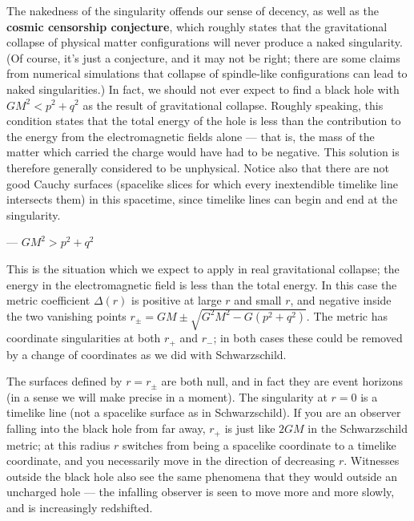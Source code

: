 \noindent  The nakedness of the singularity offends our sense of
decency, as well as the {\bf cosmic censorship conjecture}, which
roughly states that the gravitational collapse of physical
matter configurations will never produce a naked singularity.
(Of course, it's just a conjecture, and it may not be right; there
are some claims from numerical simulations that collapse of
spindle-like configurations can lead to naked singularities.)
In fact, we should not ever expect to find a black hole with
$GM^2<p^2+q^2$ as the result of gravitational collapse.  Roughly
speaking, this condition states that the total energy of the hole
is less than the contribution to the energy from the electromagnetic
fields alone --- that is, the mass of the matter which carried the
charge would have had to be negative.  This solution is therefore
generally considered to be unphysical.  Notice also that there
are not good Cauchy surfaces (spacelike slices for which every
inextendible timelike line intersects them) in this spacetime, since
timelike lines can begin and end at the singularity.

 --- $GM^2>p^2+q^2$

This is the situation which we expect to apply in real gravitational
collapse; the energy in the electromagnetic field is less than the
total energy.  In this case the metric coefficient $\Delta(r)$ is
positive at large $r$ and small $r$, and negative inside the two
vanishing points $r_\pm = GM\pm \sqrt{G^2M^2 - G(p^2+q^2)}$.  The 
metric has coordinate singularities at both $r_+$ and $r_-$; in
both cases these could be removed by a change of coordinates as we
did with Schwarzschild.

\begin{figure}[p]
  \centerline{
  }
\end{figure}

The surfaces defined by $r=r_\pm$ are both null, and in fact they
are event horizons (in a sense we will make precise in a moment).
The singularity at $r=0$ is a timelike line (not a spacelike
surface as in Schwarzschild).  If you are an observer falling into the 
black hole from far away, $r_+$ is just like $2GM$ in the Schwarzschild
metric; at this radius $r$ switches from being a spacelike coordinate
to a timelike coordinate, and you necessarily move in the
direction of decreasing $r$.  Witnesses outside the black hole also
see the same phenomena that they would outside an uncharged hole ---
the infalling observer is seen to move more and more slowly, and
is increasingly redshifted.

